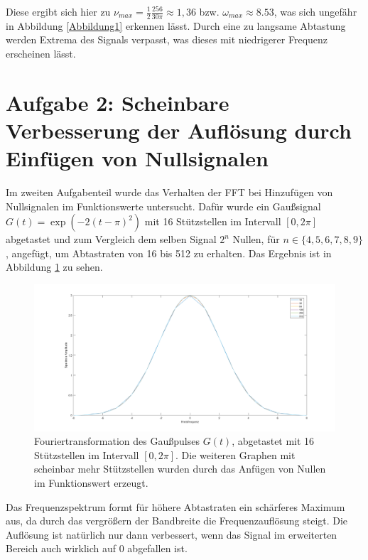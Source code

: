 \documentclass[a4paper, 10pt,onecolumn]{scrartcl}
\begin{document}
Diese ergibt sich hier zu $\nu_{max} = \frac{1}{2} \frac{256}{30\pi} \approx 1,36$ bzw. $\omega_{max} \approx 8.53$, was sich ungefähr in Abbildung \ref{Abbildung1} erkennen lässt. Durch eine zu langsame Abtastung werden Extrema des Signals verpasst, was dieses mit niedrigerer Frequenz erscheinen lässt.
\newpage

\section*{Aufgabe 2: Scheinbare Verbesserung der Auflösung durch Einfügen von Nullsignalen}

Im zweiten Aufgabenteil wurde das Verhalten der FFT bei Hinzufügen von Nullsignalen im Funktionswerte untersucht. Dafür wurde ein Gaußsignal $G(t) = \exp(-2(t-\pi)^2)$ mit 16 Stützstellen im Intervall $[0,2\pi]$ abgetastet und zum Vergleich dem selben Signal $2^n$ Nullen, für $n \in \{4,5,6,7,8,9\}$, angefügt, um Abtastraten von 16 bis 512 zu erhalten. Das Ergebnis ist in Abbildung \ref{Abbildung2} zu sehen. 


\begin{figure}[ht!]
	\includegraphics[scale=0.4,center]{sem06_2_2.png}
	\caption{Fouriertransformation des Gaußpulses $G(t)$, abgetastet mit 16 Stützstellen im Intervall $[0,2\pi]$. Die weiteren Graphen mit scheinbar mehr Stützstellen wurden durch das Anfügen von Nullen im Funktionswert erzeugt.  } 
	\label{Abbildung2}
\end{figure}


Das Frequenzspektrum formt für höhere Abtastraten ein schärferes Maximum aus, da durch das vergrößern der Bandbreite die Frequenzauflösung steigt. Die Auflösung ist natürlich nur dann verbessert, wenn das Signal im erweiterten Bereich auch wirklich auf 0 abgefallen ist.  
\end{document}
